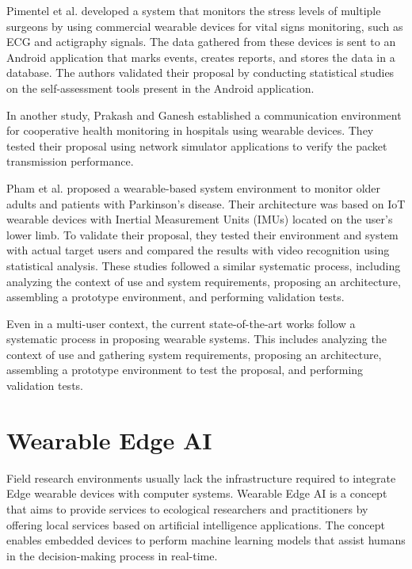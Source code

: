 Pimentel et al. \cite{pimentel2019wearable} developed a system that monitors the stress levels of multiple surgeons by using commercial wearable devices for vital signs monitoring, such as ECG and actigraphy signals. The data gathered from these devices is sent to an Android application that marks events, creates reports, and stores the data in a database. The authors validated their proposal by conducting statistical studies on the self-assessment tools present in the Android application.

In another study, Prakash and Ganesh \cite{prakash2016establishment} established a communication environment for cooperative health monitoring in hospitals using wearable devices. They tested their proposal using network simulator applications to verify the packet transmission performance.

Pham et al. \cite{pham2018validation} proposed a wearable-based system environment to monitor older adults and patients with Parkinson's disease. Their architecture was based on IoT wearable devices with Inertial Measurement Units (IMUs) located on the user's lower limb. To validate their proposal, they tested their environment and system with actual target users and compared the results with video recognition using statistical analysis. These studies followed a similar systematic process, including analyzing the context of use and system requirements, proposing an architecture, assembling a prototype environment, and performing validation tests.

Even in a multi-user context, the current state-of-the-art works follow a systematic process in proposing wearable systems. This includes analyzing the context of use and gathering system requirements, proposing an architecture, assembling a prototype environment to test the proposal, and performing validation tests.

\section{Wearable Edge AI}

Field research environments usually lack the infrastructure required to integrate Edge wearable devices with computer systems. Wearable Edge AI is a concept that aims to provide services to ecological researchers and practitioners by offering local services based on artificial intelligence applications. The concept enables embedded devices to perform machine learning models that assist humans in the decision-making process in real-time.

